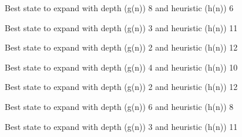 \documentclass{article}
\begin{document}
{\noindent Best state to expand with depth (g(n)) 8 and heuristic (h(n)) 6\newline}
{}\newline

{\noindent Best state to expand with depth (g(n)) 3 and heuristic (h(n)) 11\newline}
{}\newline

{\noindent Best state to expand with depth (g(n)) 2 and heuristic (h(n)) 12\newline}
{}\newline

{\noindent Best state to expand with depth (g(n)) 4 and heuristic (h(n)) 10\newline}
{}\newline

{\noindent Best state to expand with depth (g(n)) 2 and heuristic (h(n)) 12\newline}
{}\newline

{\noindent Best state to expand with depth (g(n)) 6 and heuristic (h(n)) 8\newline}
{}\newline

{\noindent Best state to expand with depth (g(n)) 3 and heuristic (h(n)) 11\newline}
{}\newline
\end{document}
